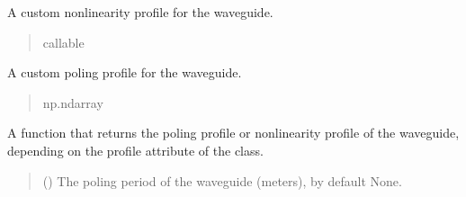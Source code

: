 \documentclass[a4paper,10pt,english]{sphinxmanual}
\begin{document}
\begin{fulllineitems}
\begin{fulllineitems}
\label{\detokenize{waveguide:pyjsa.waveguide.Waveguide.custom_nonlinearity_profile}}
\pysigstartsignatures
{}
\pysigstopsignatures
\sphinxAtStartPar
A custom nonlinearity profile for the waveguide.
\begin{quote}\begin{description}
\sphinxAtStartPar
callable

\end{description}\end{quote}

\end{fulllineitems}


\begin{fulllineitems}
\label{\detokenize{waveguide:pyjsa.waveguide.Waveguide.custom_poling_profile}}
\pysigstartsignatures
{}
\pysigstopsignatures
\sphinxAtStartPar
A custom poling profile for the waveguide.
\begin{quote}\begin{description}
\sphinxAtStartPar
np.ndarray

\end{description}\end{quote}

\end{fulllineitems}


\begin{fulllineitems}
\label{\detokenize{waveguide:pyjsa.waveguide.Waveguide.g}}
\pysigstartsignatures
{}
\pysigstopsignatures
\sphinxAtStartPar
A function that returns the poling profile or nonlinearity profile of the waveguide, depending on the profile attribute of the class.
\begin{quote}\begin{description}
\sphinxAtStartPar
{} (\sphinxstyleliteralemphasis{\sphinxupquote{, }}) \textendash{} The poling period of the waveguide (meters), by default None.


\end{description}
\end{quote}
\end{fulllineitems}
\end{fulllineitems}
\end{document}
